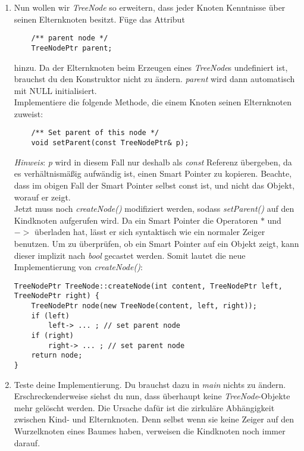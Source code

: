 \documentclass[
  accentcolor=tud1c,	%
  colorbacktitle,		%
  inverttitle,			%
  german,				%
  twoside
]{tudexercise}
\begin{document}
\begin{enumerate}
\item Nun wollen wir \emph{TreeNode} so erweitern, dass jeder Knoten Kenntnisse über seinen Elternknoten besitzt.
Füge das Attribut  
\begin{lstlisting}
	/** parent node */
	TreeNodePtr parent;
\end{lstlisting}

hinzu.
Da der Elternknoten beim Erzeugen eines \emph{TreeNode}s undefiniert ist, brauchst du den Konstruktor nicht zu ändern. \emph{parent} wird dann automatisch mit NULL initialisiert.\\

Implementiere die folgende Methode, die einem Knoten seinen Elternknoten zuweist:
\begin{lstlisting}
	/** Set parent of this node */
	void setParent(const TreeNodePtr& p);
\end{lstlisting}

\emph{Hinweis}:
\emph{p} wird in diesem Fall nur deshalb als \emph{const} Referenz übergeben, da es verhältnismäßig aufwändig ist, einen Smart Pointer zu kopieren.
Beachte, dass im obigen Fall der Smart Pointer selbst const ist, und nicht das Objekt, worauf er zeigt.\\

Jetzt muss noch \emph{createNode()} modifiziert werden, sodass \emph{setParent()} auf den Kindknoten aufgerufen wird. Da ein Smart Pointer die Operatoren $*$ und $->$ überladen hat, lässt er sich syntaktisch wie ein normaler Zeiger benutzen. Um zu überprüfen, ob ein Smart Pointer auf ein Objekt zeigt, kann dieser implizit nach \emph{bool} gecastet werden. Somit lautet die neue Implementierung von \emph{createNode()}:

\begin{lstlisting}
TreeNodePtr TreeNode::createNode(int content, TreeNodePtr left, TreeNodePtr right) {
	TreeNodePtr node(new TreeNode(content, left, right));
	if (left)
		left-> ... ; // set parent node
	if (right)
		right-> ... ; // set parent node
	return node;
}
\end{lstlisting}

\item
Teste deine Implementierung.
Du brauchst dazu in \emph{main} nichts zu ändern.\\

Erschreckenderweise siehst du nun, dass überhaupt keine \emph{TreeNode}-Objekte mehr gelöscht werden.
Die Ursache dafür ist die zirkuläre Abhängigkeit zwischen Kind- und Elternknoten.
Denn selbst wenn sie keine Zeiger auf den Wurzelknoten eines Baumes haben, verweisen die Kindknoten noch immer darauf. \\


\end{enumerate}
\end{document}
